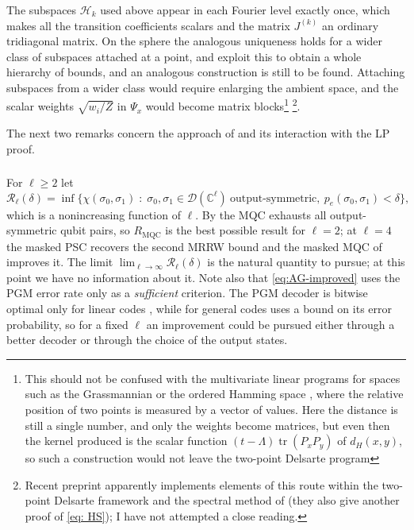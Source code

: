 \documentclass[11pt]{amsart}
\theoremstyle{plain}
\theoremstyle{remark}
\newcommand{\C}{\mathbb{C}}
\newcommand{\tr}{\operatorname{tr}}
\newcommand{\cH}{\mathcal H}
\newcommand{\cR}{\mathcal R}
\begin{document}
\subsubsection{}
The subspaces $\cH_k$ used above appear in each Fourier level exactly once, which makes all the transition coefficients scalars and
the matrix $J^{(k)}$ an ordinary tridiagonal matrix. On the sphere the analogous
uniqueness holds for a wider class of subspaces attached at a point, and
\cite{OAI26} exploit this to obtain a whole hierarchy of bounds, and an analogous construction is still to be found. 
Attaching subspaces from a wider class would require enlarging the
ambient space, and the scalar weights $\sqrt{w_i/Z}$ in $\Psi_x$ would become
matrix blocks\footnote{This should not be confused with the multivariate linear programs for spaces
such as the Grassmannian \cite{Bachoc06} or the ordered Hamming space \cite{BP09}, where the relative position of two points is measured by a vector of values. Here the distance is still a single
number, and only the weights become matrices, but even then the
kernel produced is the scalar function $(t-\Lambda)\tr(P_xP_y)$ of $d_H(x,y)$, so such a construction would not leave the two-point Delsarte program} \footnote{Recent preprint \cite{gay2026honeycombframeworkcodebounds} apparently implements elements of this route within the two-point Delsarte framework and the spectral method of \cite{BN06} (they also give another proof of \eqref{eq: HS}); I have not attempted a close reading.}\cite[Remark~1.6]{OAI26}.


\vspace*{.1in}
The next two remarks concern the approach of \cite{AG26} and its interaction with the LP proof.

\subsubsection{} 
For $\ell\ge2$ let
\[
 \cR_\ell(\delta)=\inf\bigl\{\chi(\sigma_0,\sigma_1)\;:\;
 \sigma_0,\sigma_1\in\mathcal D(\C^{\ell})\ \text{output-symmetric},\
 p_e(\sigma_0,\sigma_1)<\delta\bigr\},
\]
which is a nonincreasing function of $\ell$. By \cite[Remark~5.2]{AG26} the MQC exhausts all
output-symmetric qubit pairs, so $R_{\mathrm{MQC}}$ is the best possible result for $\ell=2$; at $\ell=4$ the masked PSC recovers the second MRRW bound and the masked MQC of \cite[\S5.2]{AG26} improves it. The limit
$\lim_{\ell\to\infty}\cR_\ell(\delta)$ is the natural quantity to pursue; at this point we have no information
about it. Note also that \eqref{eq:AG-improved} uses the PGM error rate only as a {\em sufficient} criterion. The PGM decoder is bitwise optimal only for linear codes \cite[Fact 28]{AG26}, while for general codes \cite{AG26} uses a bound on its error probability, so for a fixed $\ell$ an improvement could
be pursued either through a better decoder or through the choice of the output states.
\end{document}
